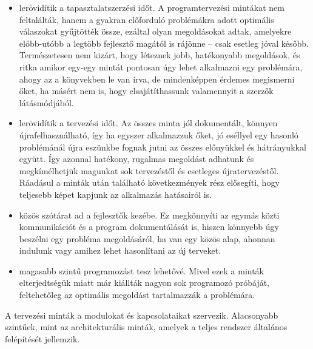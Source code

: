 \documentclass[margin=0px]{article}
\begin{document}
\begin{itemize}
    \item lerövidítik a tapasztalatszerzési időt. A programtervezési mintákat nem feltalálták, hanem a gyakran előforduló problémákra adott optimális válaszokat gyűjtötték össze, ezáltal olyan megoldásokat adtak, amelyekre előbb-utóbb a legtöbb fejlesztő magától is rájönne – csak esetleg jóval később. Természetesen nem kizárt, hogy léteznek jobb, hatékonyabb megoldások, és ritka amikor egy-egy mintát pontosan úgy lehet alkalmazni egy problémára, ahogy az a könyvekben le van írva, de mindenképpen érdemes megismerni őket, ha másért nem is, hogy elsajátíthassunk valamennyit a szerzők látásmódjából.
    \item lerövidítik a tervezési időt. Az összes minta jól dokumentált, könnyen újrafelhasználható, így ha egyszer alkalmazzuk őket, jó eséllyel egy hasonló problémánál újra eszünkbe fognak jutni az összes előnyükkel és hátrányukkal együtt. Így azonnal hatékony, rugalmas megoldást adhatunk és megkímélhetjük magunkat sok tervezéstől és esetleges újratervezéstől. Ráadásul a minták után található következmények rész elősegíti, hogy teljesebb képet kapjunk az alkalmazás hatásairól is.
    \item közös szótárat ad a fejlesztők kezébe. Ez megkönnyíti az egymás közti kommunikációt és a program dokumentálását is, hiszen könnyebb úgy beszélni egy probléma megoldásáról, ha van egy közös alap, ahonnan indulunk vagy amihez lehet hasonlítani az új terveket.
    \item magasabb szintű programozást tesz lehetővé. Mivel ezek a minták elterjedtségük miatt már kiállták nagyon sok programozó próbáját, feltehetőleg az optimális megoldást tartalmazzák a problémára.
\end{itemize}

A tervezési minták a modulokat és kapcsolataikat szervezik. Alacsonyabb szintűek, mint az architekturális minták, amelyek a teljes rendszer általános felépítését jellemzik.
\end{document}
